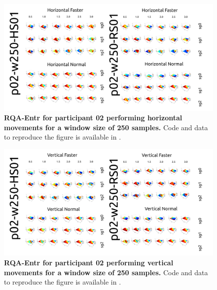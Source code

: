 \documentclass[12pt]{article}
\begin{document}
\newpage
\begin{figure}[ht!]
\centering
\includegraphics{figures/rqa/output/epsilons/rqa-epsilonsp02w250Horizontal}
    	\caption{
	{\bf RQA-Entr for participant 02 performing horizontal movements for a window size of 250 samples.}
	Code and data to reproduce the figure is available in \cite{srep2020}.
        }
    \label{fig-p02-H-w250}
\end{figure}
\begin{figure}[hb!]
\centering
\includegraphics{figures/rqa/output/epsilons/rqa-epsilonsp02w250Vertical}
    	\caption{
	{\bf RQA-Entr for participant 02 performing vertical movements for a window size of 250 samples.}
	Code and data to reproduce the figure is available in \cite{srep2020}.
        }
    \label{fig-p02-V-w250}
\end{figure}
\end{document}
